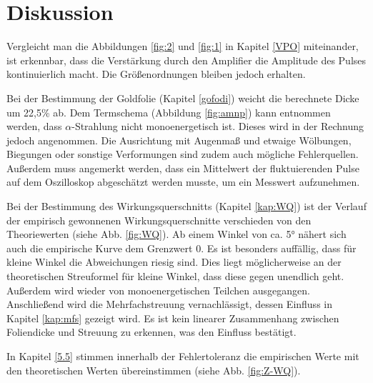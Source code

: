\section{Diskussion}
Vergleicht man die Abbildungen \ref{fig:2} und \ref{fig:1} in Kapitel \ref{VPO} miteinander,
ist erkennbar, dass die Verstärkung durch den Amplifier die Amplitude des Pulses
kontinuierlich macht.
Die Größenordnungen bleiben jedoch erhalten.

Bei der Bestimmung der Goldfolie (Kapitel \ref{gofodi}) weicht die berechnete Dicke um 22,5\% ab.
Dem Termschema (Abbildung \ref{fig:amnp}) kann entnommen werden, dass $\alpha$-Strahlung nicht monoenergetisch ist.
Dieses wird in der Rechnung jedoch angenommen.
Die Ausrichtung mit Augenmaß und etwaige Wölbungen, Biegungen oder sonstige Verformungen sind zudem auch mögliche Fehlerquellen.
Außerdem muss angemerkt werden, dass ein Mittelwert der fluktuierenden Pulse auf dem Oszilloskop abgeschätzt werden musste, um ein Messwert aufzunehmen.

Bei der Bestimmung des Wirkungsquerschnitts (Kapitel \ref{kap:WQ}) ist der Verlauf der empirisch gewonnenen Wirkungsquerschnitte verschieden von den Theoriewerten (siehe Abb. \ref{fig:WQ}).
Ab einem Winkel von ca. 5° nähert sich auch die empirische Kurve dem Grenzwert 0.
Es ist besonders auffällig, dass für kleine Winkel die Abweichungen riesig sind.
Dies liegt möglicherweise an der theoretischen Streuformel für kleine Winkel, dass diese gegen unendlich geht.
Außerdem wird wieder von monoenergetischen Teilchen ausgegangen.
Anschließend wird die Mehrfachstreuung vernachlässigt, dessen Einfluss in Kapitel \ref{kap:mfs} gezeigt wird.
Es ist kein linearer Zusammenhang zwischen Foliendicke und Streuung zu erkennen, was den Einfluss bestätigt.

In Kapitel \ref{5.5} stimmen innerhalb der Fehlertoleranz die empirischen Werte mit den theoretischen Werten übereinstimmen (siehe Abb. \ref{fig:Z-WQ}).
